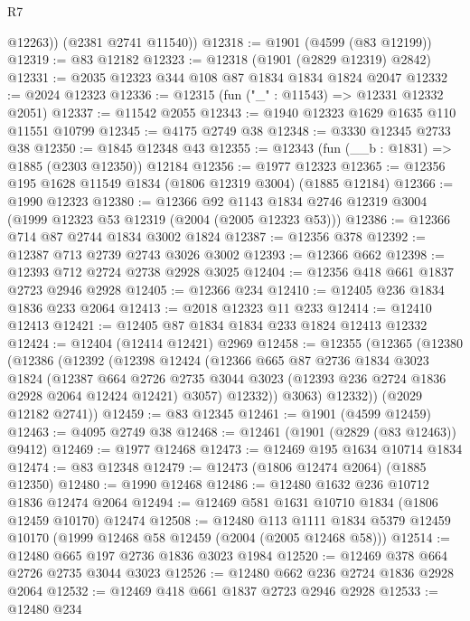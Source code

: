 \begin{lexlean}{R7}
\begin{coremodule}
          @12263))
      (@2381 @2741 @11540))
@12318 := @1901 (@4599 (@83 @12199))
@12319 := @83 @12182
@12323 := @12318 (@1901 (@2829 @12319) @2842)
@12331 := @2035 @12323 @344 @108 @87 @1834 @1834 @1824 @2047
@12332 := @2024 @12323
@12336 := @12315 (fun ("_" : @11543) => @12331 @12332 @2051)
@12337 := @11542 @2055
@12343 := @1940 @12323 @1629 @1635 @110 @11551 @10799
@12345 := @4175 @2749 @38
@12348 := @3330 @12345 @2733 @38
@12350 := @1845 @12348 @43
@12355 := @12343 (fun (__b : @1831) => @1885 (@2303 @12350)) @12184
@12356 := @1977 @12323
@12365 := @12356 @195 @1628 @11549 @1834 (@1806 @12319 @3004) (@1885 @12184)
@12366 := @1990 @12323
@12380 := @12366
    @92
    @1143
    @1834
    @2746
    @12319
    @3004
    (@1999 @12323 @53 @12319 (@2004 (@2005 @12323 @53)))
@12386 := @12366 @714 @87 @2744 @1834 @3002 @1824
@12387 := @12356 @378
@12392 := @12387 @713 @2739 @2743 @3026 @3002
@12393 := @12366 @662
@12398 := @12393 @712 @2724 @2738 @2928 @3025
@12404 := @12356 @418 @661 @1837 @2723 @2946 @2928
@12405 := @12366 @234
@12410 := @12405 @236 @1834 @1836 @233 @2064
@12413 := @2018 @12323 @11 @233
@12414 := @12410 @12413
@12421 := @12405 @87 @1834 @1834 @233 @1824 @12413 @12332
@12424 := @12404 (@12414 @12421) @2969
@12458 := @12355
    (@12365
      (@12380
        (@12386
          (@12392
            (@12398
              @12424
              (@12366
                @665
                @87
                @2736
                @1834
                @3023
                @1824
                (@12387
                  @664
                  @2726
                  @2735
                  @3044
                  @3023
                  (@12393 @236 @2724 @1836 @2928 @2064 @12424 @12421)
                  @3057)
                @12332))
            @3063)
          @12332))
      (@2029 @12182 @2741))
@12459 := @83 @12345
@12461 := @1901 (@4599 @12459)
@12463 := @4095 @2749 @38
@12468 := @12461 (@1901 (@2829 (@83 @12463)) @9412)
@12469 := @1977 @12468
@12473 := @12469 @195 @1634 @10714 @1834
@12474 := @83 @12348
@12479 := @12473 (@1806 @12474 @2064) (@1885 @12350)
@12480 := @1990 @12468
@12486 := @12480 @1632 @236 @10712 @1836 @12474 @2064
@12494 := @12469 @581 @1631 @10710 @1834 (@1806 @12459 @10170) @12474
@12508 := @12480
    @113
    @1111
    @1834
    @5379
    @12459
    @10170
    (@1999 @12468 @58 @12459 (@2004 (@2005 @12468 @58)))
@12514 := @12480 @665 @197 @2736 @1836 @3023 @1984
@12520 := @12469 @378 @664 @2726 @2735 @3044 @3023
@12526 := @12480 @662 @236 @2724 @1836 @2928 @2064
@12532 := @12469 @418 @661 @1837 @2723 @2946 @2928
@12533 := @12480 @234

\end{coremodule}
\end{lexlean}

